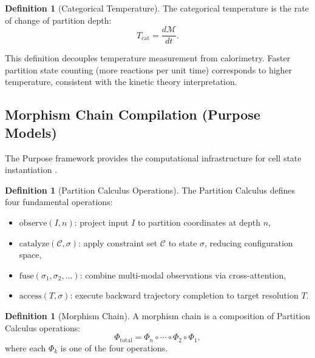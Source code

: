 \documentclass[twocolumn,10pt,a4paper]{article}
\theoremstyle{definition}
\newtheorem{definition}[theorem]{Definition}
\theoremstyle{remark}
\newcommand{\Depth}{\mathcal{M}}
\newcommand{\morphism}{\Phi}
\newcommand{\catalyst}{\mathcal{C}}
\begin{document}
\begin{definition}[Categorical Temperature]
\label{def:cat_temp}
The categorical temperature is the rate of change of partition depth:
\begin{equation}
    T_{\mathrm{cat}} = \frac{d\Depth}{dt}.
    \label{eq:cat_temp}
\end{equation}
\end{definition}

This definition decouples temperature measurement from calorimetry. Faster partition state counting (more reactions per unit time) corresponds to higher temperature, consistent with the kinetic theory interpretation.

\subsection{Morphism Chain Compilation (Purpose Models)}
\label{sec:purpose_models}

The Purpose framework provides the computational infrastructure for cell state instantiation \citep{Sachikonye2024f}.

\begin{definition}[Partition Calculus Operations]
\label{def:operations}
The Partition Calculus defines four fundamental operations:
\begin{itemize}[nosep]
    \item $\mathrm{observe}(I, n)$: project input $I$ to partition coordinates at depth $n$,
    \item $\mathrm{catalyze}(\catalyst, \sigma)$: apply constraint set $\catalyst$ to state $\sigma$, reducing configuration space,
    \item $\mathrm{fuse}(\sigma_1, \sigma_2, \ldots)$: combine multi-modal observations via cross-attention,
    \item $\mathrm{access}(T, \sigma)$: execute backward trajectory completion to target resolution $T$.
\end{itemize}
\end{definition}

\begin{definition}[Morphism Chain]
\label{def:chain}
A morphism chain is a composition of Partition Calculus operations:
\begin{equation}
    \morphism_{\mathrm{total}} = \morphism_n \circ \cdots \circ \morphism_2 \circ \morphism_1,
    \label{eq:chain}
\end{equation}
where each $\morphism_k$ is one of the four operations.
\end{definition}
\end{document}
